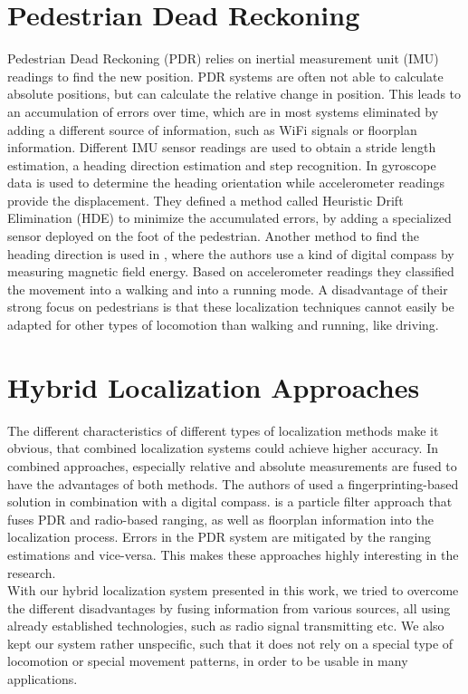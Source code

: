 \section{Pedestrian Dead Reckoning}
Pedestrian Dead Reckoning (PDR) relies on inertial measurement unit (IMU) readings to find the new position. PDR systems are often not able to calculate absolute positions, but can calculate the relative change in position. This leads to an accumulation of errors over time, which are in most systems eliminated by adding a different source of information, such as WiFi signals or floorplan information. Different IMU sensor readings are used to obtain a stride length estimation, a heading direction estimation and step recognition. In \cite{Borestein} gyroscope data is used to determine the heading orientation while accelerometer readings provide the displacement. They defined a method called Heuristic Drift Elimination (HDE) to minimize the accumulated errors, by adding a specialized sensor deployed on the foot of the pedestrian. Another method to find the heading direction is used in \cite{Kakiuchi}, where the authors use a kind of digital compass by measuring magnetic field energy. Based on accelerometer readings they classified the movement into a walking and into a running mode. A disadvantage of their strong focus on pedestrians is that these localization techniques cannot easily be adapted for other types of locomotion than walking and running, like driving.  

\section{Hybrid Localization Approaches}
The different characteristics of different types of localization methods make it obvious, that combined localization systems could achieve higher accuracy. In combined approaches, especially relative and absolute measurements are fused to have the advantages of both methods. The authors of \cite{Nagpal} used a fingerprinting-based solution in combination with a digital compass. \cite{Carrera} is a particle filter approach that fuses PDR and radio-based ranging, as well as floorplan information into the localization process. Errors in the PDR system are mitigated by the ranging estimations and vice-versa. This makes these approaches highly interesting in the research.\\
\noindent\hspace*{5mm}%
With our hybrid localization system presented in this work, we tried to overcome the different disadvantages by fusing information from various sources, all using already established technologies, such as radio signal transmitting etc. We also kept our system rather unspecific, such that it does not rely on a special type of locomotion or special movement patterns, in order to be usable in many applications.